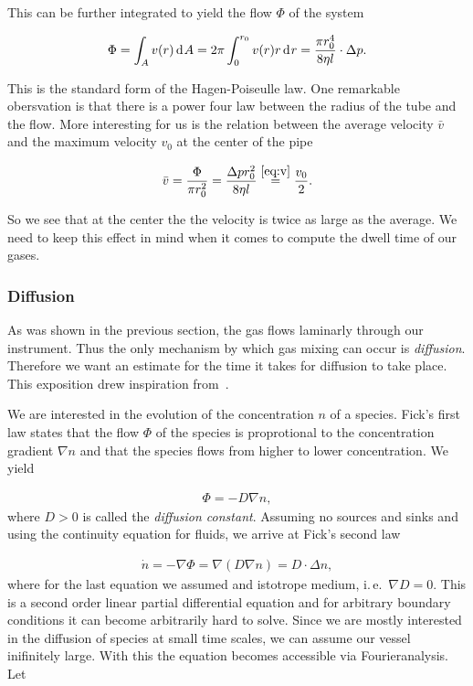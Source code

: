 This can be further integrated to yield the flow $\Phi$ of the system

\begin{align*}
  \Phi = \int_A v(r) \d[A] = 2\pi \int_0^{r_0} v(r)r \d[r] = \frac{\pi
  r_0^4}{8\eta l} \cdot \Delta p.
\end{align*}

This is the standard form of the Hagen-Poiseulle law. One remarkable
obersvation is that there is a power four law between the radius of
the tube and the flow. More interesting for us is the relation between
the average velocity $\bar v$ and the maximum velocity $v_0$ at the
center of the pipe

\begin{align*}
  \bar v = \frac{\Phi}{\pi r_0^2} = \frac{\Delta p r_0^2}{8\eta l} \stackrel{\eqref{eq:v}}{=} \frac{v_0}{2}.
\end{align*}

So we see that at the center the the velocity is twice as large as the
average. We need to keep this effect in mind when it comes to compute
the dwell time of our gases.

\subsubsection{Diffusion}
\label{sec:diffusion}

As was shown in the previous section, the gas flows laminarly through
our instrument. Thus the only mechanism by which gas mixing can occur
is \emph{diffusion}. Therefore we want an estimate for the time it
takes for diffusion to take place. This exposition drew inspiration
from~\cite{fluid}.

We are interested in the evolution of the concentration $n$ of a
species. Fick's first law states that the flow $\Phi$ of the species
is proprotional to the concentration gradient $\nabla n$ and that the
species flows from higher to lower concentration. We yield

\begin{align*}
  \Phi = - D \nabla n,
\end{align*}
where $D > 0$ is called the \emph{diffusion constant}. Assuming no
sources and sinks and using the continuity equation for fluids, we
arrive at Fick's second law

\begin{align*}
  \dot n = - \nabla \Phi = \nabla (D \nabla n) = D \cdot \Delta n,
\end{align*}
where for the last equation we assumed and istotrope medium, i.\,e.\
$\nabla D = 0$. This is a second order linear partial differential
equation and for arbitrary boundary conditions it can become
arbitrarily hard to solve. Since we are mostly interested in the
diffusion of species at small time scales, we can assume our vessel
inifinitely large. With this the equation becomes accessible via
Fourieranalysis. Let

